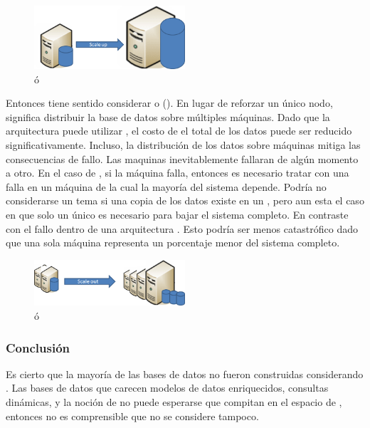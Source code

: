 \begin{figure}[h!]
	\centering
	\includegraphics[width=0.5\textwidth]{figuras/cap2/scale_up.png}
	\caption{\verticalScalingDB ó \scalingUpDB }
	\label{figure:figure_scale_up}
\end{figure}

Entonces tiene sentido  considerar \horizontalScalingDB o \scalingOutDB(). En lugar de reforzar un único nodo, \horizontalScalingDB significa distribuir la base de datos sobre múltiples máquinas. Dado que la arquitectura \horizontallyScaledDB puede utilizar \commodityHardwarePC, el costo de \hostingDB el total de los datos puede ser reducido significativamente. Incluso, la distribución  de los datos sobre máquinas mitiga las consecuencias de fallo. Las maquinas inevitablemente fallaran de algún momento a otro. En el caso de \verticalScalingDB , si la máquina falla, entonces es necesario tratar con una falla en un máquina de la cual la mayoría del sistema depende. Podría no considerarse un tema si una copia de los datos existe en un \replicatedSlaveDB, pero aun esta el caso en que solo un único \serverAS es necesario para bajar el sistema completo. En contraste con el fallo dentro de una arquitectura \horizontallyScaledDB. Esto podría ser menos catastrófico dado que una sola máquina representa un porcentaje menor del sistema completo.

\begin{figure}[h!]
	\centering
	\includegraphics[width=0.5\textwidth]{figuras/cap2/scale_out.png}
	\caption{\horizontalScalingDB ó \scalingOutDB }
	\label{figure:figure_scale_out}
\end{figure}

\subsubsection{Conclusión}

Es cierto que la mayoría de las bases de datos \nosql no fueron construidas considerando \ecommerce. Las bases de datos que carecen modelos de datos enriquecidos, consultas dinámicas, y la noción de \transactionalityDB no puede esperarse que compitan en el espacio de \ecommerce, entonces no es comprensible que no se considere \mongodbNAME tampoco.

